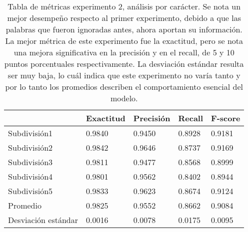 \begin{table}[h]
    \centering
    \caption{Tabla de métricas experimento 2, análisis por carácter. Se nota un mejor desempeño respecto al primer experimento, debido a que las palabras que fueron ignoradas antes, ahora aportan su información. La mejor métrica de este experimento fue la exactitud, pero se nota una mejora significativa en la precisión y en el recall, de 5 y 10 puntos porcentuales respectivamente. La desviación estándar resulta ser muy baja, lo cuál indica que este experimento no varía tanto y por lo tanto los promedios describen el comportamiento esencial del modelo. }
\begin{tabular}{|l|llll|}
\hline
                        & Exactitud &     Precisión &     Recall  &   F-score \\ \hline
              
Subdivisión1            &       0.9840  &       0.9450  &       0.8928  &       0.9181  \\ 
Subdivisión2            &       0.9842  &       0.9646  &       0.8737  &       0.9169  \\ 
Subdivisión3            &       0.9811  &       0.9477  &       0.8568  &       0.8999  \\ 
Subdivisión4            &       0.9801  &       0.9562  &       0.8402  &       0.8944  \\ 
Subdivisión5            &       0.9833  &       0.9623  &       0.8674  &       0.9124  \\ \hline
Promedio                &       0.9825  &       0.9552  &       0.8662  &       0.9084  \\ \hline
Desviación estándar     &       0.0016  &       0.0078  &       0.0175  &       0.0095  \\ \hline
              
\end{tabular}
		     \label{tab:exp2}
\end{table}
